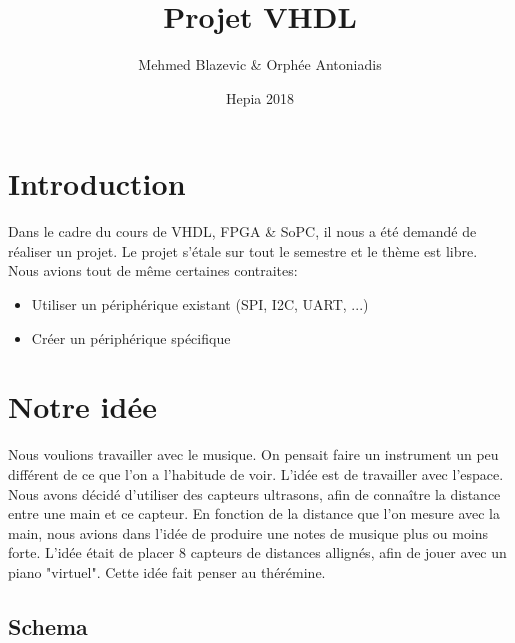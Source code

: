 \documentclass[a4paper]{article}
\title{Projet VHDL}
\author{Mehmed Blazevic \& Orphée Antoniadis}
\date{Hepia 2018}
\begin{document}
\maketitle

\section{Introduction}
Dans le cadre du cours de VHDL, FPGA \& SoPC, il nous a été demandé de réaliser un projet.
Le projet s'étale sur tout le semestre et le thème est libre. Nous avions tout de
même certaines contraites:

\begin{itemize}
  \item Utiliser un périphérique existant (SPI, I2C, UART, ...)
  \item Créer un périphérique spécifique
\end{itemize}

\section{Notre idée}
Nous voulions travailler avec le musique. On pensait faire un instrument un peu
différent de ce que l'on a l'habitude de voir. L'idée est de travailler avec l'espace.
Nous avons décidé d'utiliser des capteurs ultrasons, afin de connaître la distance
entre une main et ce capteur. En fonction de la distance que l'on mesure avec la main,
nous avions dans l'idée de produire une notes de musique plus ou moins forte.
L'idée était de placer 8 capteurs de distances allignés, afin de jouer avec un piano
"virtuel". Cette idée fait penser au thérémine.

\subsection{Schema}

\begin{center}
\noindent{}
\end{center}
\end{document}
